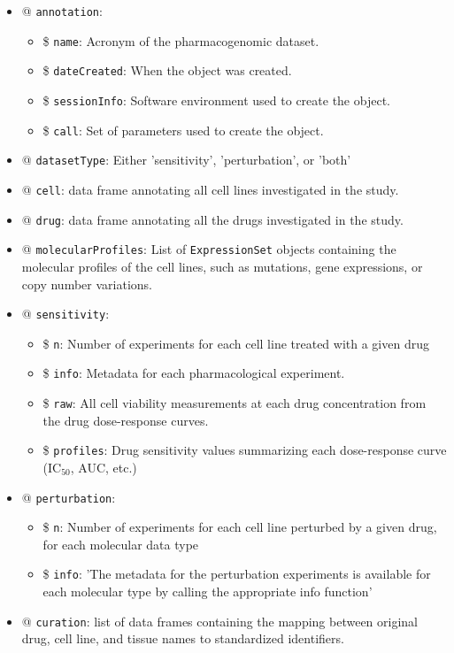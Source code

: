 \documentclass[11pt]{article}
\newenvironment{myitemize}
{ \begin{itemize}
    \setlength{\itemsep}{0.5pt}
    \setlength{\parskip}{0.5pt}
    \setlength{\parsep}{0.5pt}     }
{ \end{itemize}                  }
\begin{document}
\begin{myitemize}
\item[@] \texttt{annotation}:
\vspace{-0.2cm}
    \begin{myitemize}
  \item[\$] \texttt{name}: Acronym of the pharmacogenomic dataset.
	\item[\$] \texttt{dateCreated}: When the object was created.
	\item[\$] \texttt{sessionInfo}: Software environment used to create the object.
	\item[\$] \texttt{call}: Set of parameters used to create the object.
	\end{myitemize}
\vspace{-0.2cm}
\item[@] \texttt{datasetType}: Either 'sensitivity', 'perturbation', or 'both'
\item[@] \texttt{cell}: data frame annotating all cell lines investigated in the study.
\item[@] \texttt{drug}: data frame annotating all the drugs investigated in the study.
\item[@] \texttt{molecularProfiles}: List of \texttt{ExpressionSet} objects containing the molecular profiles of the cell lines, such as mutations, gene expressions, or copy number variations.
\item[@] \texttt{sensitivity}:
	\vspace{-0.2cm}
    \begin{myitemize}
   	\item[\$] \texttt{n}: Number of experiments for each cell line treated with a given drug
	\item[\$] \texttt{info}: Metadata for each pharmacological experiment.
	\item[\$] \texttt{raw}: All cell viability measurements at each drug concentration from the drug dose-response curves.
	\item[\$] \texttt{profiles}: Drug sensitivity values summarizing each dose-response curve (IC$_{50}$, AUC, etc.)
	\end{myitemize}
\vspace{-0.2cm}
\item[@] \texttt{perturbation}:
	\vspace{-0.2cm}
    \begin{myitemize}
   	\item[\$] \texttt{n}: Number of experiments for each cell line perturbed by a given drug, for each molecular data type
	\item[\$] \texttt{info}: 'The metadata for the perturbation experiments is available for each molecular type by calling the appropriate info function'
	\end{myitemize}
\vspace{-0.2cm}
\item[@] \texttt{curation}: list of data frames containing the mapping between original drug, cell line, and tissue names to standardized identifiers.
\end{myitemize}
\end{document}
